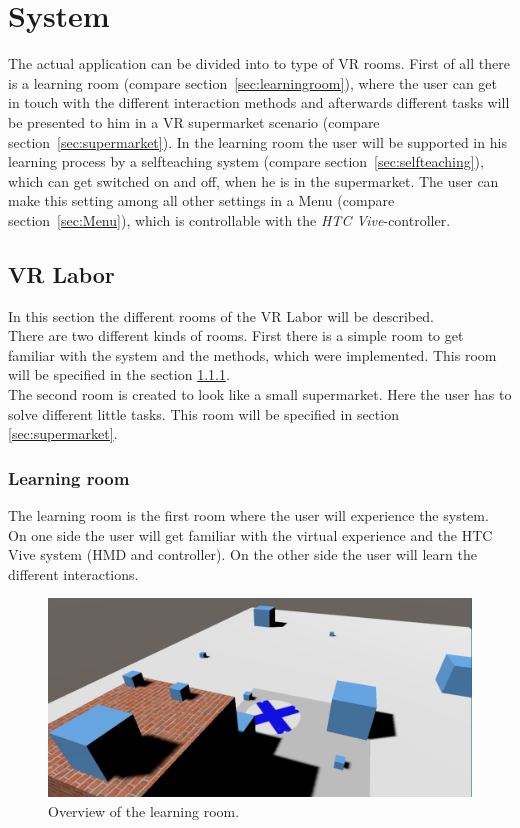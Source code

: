 
\section{System}\label{sec:System}
The actual application can be divided into to type of VR rooms. First of all there is a learning room (compare section~\ref{sec:learningroom}), where the user can get in touch with the different interaction methods and afterwards different tasks will be presented to him in a VR supermarket scenario (compare section~\ref{sec:supermarket}). In the learning room the user will be supported in his learning process by a selfteaching system (compare section~\ref{sec:selfteaching}), which can get switched on and off, when he is in the supermarket. The user can make this setting among all other settings in a Menu  (compare section~\ref{sec:Menu}), which is controllable with the \textit{HTC Vive}-controller. 

\subsection{VR Labor}\label{sec:VRLabor}
In this section the different rooms of the VR Labor will be described. \\
There are two different kinds of rooms. First there is a simple room to get familiar with the system and the methods, which were implemented. This room will be specified in the section \ref{sec:Learningroom}.\\
The second room is created to look like a small supermarket. Here the user has to solve different little tasks. This room will be specified in section \ref{sec:supermarket}.

\subsubsection{Learning room} \label{sec:Learningroom}
The learning room is the first room where the user will experience the system. On one side the user will get familiar with the virtual experience and the HTC Vive system (HMD and controller). On the other side the user will learn the different interactions. 

\begin{figure}[H] 
	\center 
	\includegraphics[width=12cm]{Images/learningRoom2.PNG}			
	\caption[Overview of the learning room.]{Overview of the learning room.}
	\label{fig:learning room}
\end{figure}

